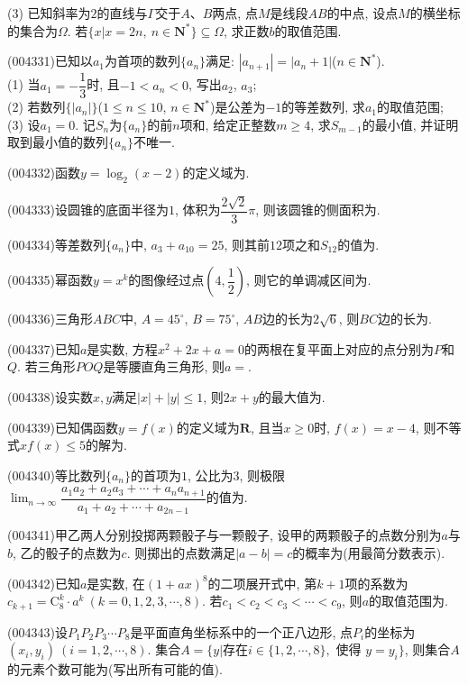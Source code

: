 (3) 已知斜率为$2$的直线与$\Gamma$交于$A$、$B$两点, 点$M$是线段$AB$的中点, 设点$M$的横坐标的集合为$\Omega$. 若$\{x|x=2n,\ n\in \mathbf{N}^* \}\subseteq \Omega$, 求正数$b$的取值范围.
\item (004331)已知以$a_1$为首项的数列$\{a_n\}$满足: $|a_{n+1}|=|a_n+1|$($n\in \mathbf{N}^*$).\\
(1) 当$a_1=-\dfrac 13$时, 且$-1<a_n<0$, 写出$a_2$, $a_3$;\\
(2) 若数列$\{|a_n|\}$($1\le n\le 10$, $n\in \mathbf{N}^*$)是公差为$-1$的等差数列, 求$a_1$的取值范围;\\
(3) 设$a_1=0$. 记$S_n$为$\{a_n\}$的前$n$项和, 给定正整数$m\ge 4$, 求$S_{m-1}$的最小值, 并证明取到最小值的数列$\{a_n\}$不唯一.
\item (004332)函数$y=\log_2(x-2)$的定义域为.
\item (004333)设圆锥的底面半径为$1$, 体积为$\dfrac{2\sqrt 2}3\pi$, 则该圆锥的侧面积为.
\item (004334)等差数列$\{a_n\}$中, $a_3+a_{10}=25$, 则其前$12$项之和$S_{12}$的值为.
\item (004335)幂函数$y=x^k$的图像经过点$(4,\dfrac 12)$, 则它的单调减区间为.
\item (004336)三角形$ABC$中, $A=45^\circ$, $B=75^\circ$, $AB$边的长为$2\sqrt 6$, 则$BC$边的长为.
\item (004337)已知$a$是实数, 方程$x^2+2x+a=0$的两根在复平面上对应的点分别为$P$和$Q$. 若三角形$POQ$是等腰直角三角形, 则$a=$.
\item (004338)设实数$x,y$满足$|x|+|y|\le 1$, 则$2x+y$的最大值为.
\item (004339)已知偶函数$y=f(x)$的定义域为$\mathbf{R}$, 且当$x\ge 0$时, $f(x)=x-4$, 则不等式$xf(x)\le 5$的解为.
\item (004340)等比数列$\{a_n\}$的首项为$1$, 公比为$3$, 则极限$\lim_{n\to \infty}\dfrac{a_1a_2+a_2a_3+\cdots+a_na_{n+1}}{a_1+a_2+\cdots+a_{2n-1}}$的值为.
\item (004341)甲乙两人分别投掷两颗骰子与一颗骰子, 设甲的两颗骰子的点数分别为$a$与$b$, 乙的骰子的点数为$c$. 则掷出的点数满足$|a-b|=c$的概率为(用最简分数表示).
\item (004342)已知$a$是实数, 在$(1+ax)^8$的二项展开式中, 第$k+1$项的系数为$c_{k+1}=\mathrm{C}_8^k\cdot a^k \ (k=0,1,2,3,\cdots,8)$. 若$c_1<c_2<c_3<\cdots<c_9$, 则$a$的取值范围为.
\item (004343)设$P_1P_2P_3\cdots P_8$是平面直角坐标系中的一个正八边形, 点$P_i$的坐标为$(x_i,y_i) \ (i=1,2,\cdots,8)$. 集合$A=\{y|\text{存在} i\in \{1,2,\cdots,8\},\text{ 使得 }y=y_i\}$, 则集合$A$的元素个数可能为(写出所有可能的值).
